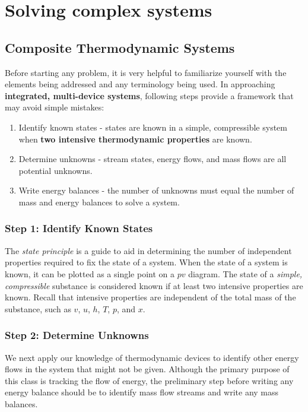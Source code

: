 \section{Solving complex systems}
\subsection{Composite Thermodynamic Systems}
Before starting any problem, it is very helpful to familiarize yourself with the elements being addressed and any terminology being used. In approaching \textbf{integrated, multi-device systems}, following steps provide a framework that may avoid simple mistakes:
\begin{enumerate}
\item Identify known states - states are known in a simple, compressible system when \textbf{two intensive thermodynamic properties} are known.
\item Determine unknowns - stream states, energy flows, and mass flows are all potential unknowns.
\item Write energy balances - the number of unknowns must equal the number of mass and energy balances to solve a system.
\end{enumerate}

\subsubsection{Step 1: Identify Known States}

The \emph{state principle} is a guide to aid in determining the number of independent properties required to fix the state of a system. When the state of a system is known, it can be plotted as a single point on a $pv$ diagram. The state of a \emph{simple, compressible} substance is considered known if at least two intensive properties are known. Recall that intensive properties are independent of the total mass of the substance, such as $v$, $u$, $h$, $T$, $p$, and $x$.

\subsubsection{Step 2: Determine Unknowns}

We next apply our knowledge of thermodynamic devices to identify other energy flows in the system that might not be given.  Although the primary purpose of this class is tracking the flow of energy, the preliminary step before writing any energy balance should be to identify mass flow streams and write any mass balances. 

